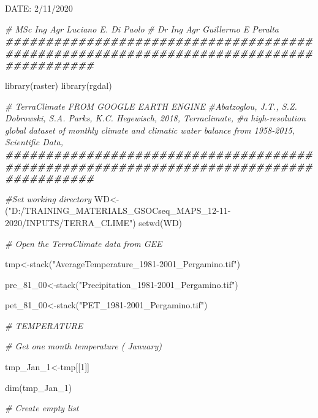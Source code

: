 \documentclass[
  10pt,
  b5paper,
]{book}
\newenvironment{Shaded}{\begin{snugshade}}{\end{snugshade}}
\newcommand{\CommentTok}[1]{\textcolor[rgb]{0.56,0.35,0.01}{\textit{#1}}}
\newcommand{\DecValTok}[1]{\textcolor[rgb]{0.00,0.00,0.81}{#1}}
\newcommand{\DocumentationTok}[1]{\textcolor[rgb]{0.56,0.35,0.01}{\textbf{\textit{#1}}}}
\newcommand{\FunctionTok}[1]{\textcolor[rgb]{0.00,0.00,0.00}{#1}}
\newcommand{\NormalTok}[1]{#1}
\newcommand{\OtherTok}[1]{\textcolor[rgb]{0.56,0.35,0.01}{#1}}
\newcommand{\SpecialCharTok}[1]{\textcolor[rgb]{0.00,0.00,0.00}{#1}}
\newcommand{\StringTok}[1]{\textcolor[rgb]{0.31,0.60,0.02}{#1}}
\begin{document}
\begin{Shaded}
\begin{Highlighting}[]
\NormalTok{DATE}\SpecialCharTok{:}  \DecValTok{2}\SpecialCharTok{/}\DecValTok{11}\SpecialCharTok{/}\DecValTok{2020}

\CommentTok{\#  MSc Ing Agr Luciano E. Di Paolo}
\CommentTok{\#  Dr Ing Agr Guillermo E Peralta}
\DocumentationTok{\#\#\#\#\#\#\#\#\#\#\#\#\#\#\#\#\#\#\#\#\#\#\#\#\#\#\#\#\#\#\#\#\#\#\#\#\#\#\#\#\#\#\#\#\#\#\#\#\#\#\#\#\#\#\#\#\#\#\#\#\#\#\#\#\#\#\#\#\#\#\#\#\#\#\#\#\#\#\#\#\#\#\#\#\#\#\#}

\FunctionTok{library}\NormalTok{(raster)}
\FunctionTok{library}\NormalTok{(rgdal)}


\CommentTok{\# TerraClimate FROM GOOGLE EARTH ENGINE}
\CommentTok{\#Abatzoglou, J.T., S.Z. Dobrowski, S.A. Parks, K.C. Hegewisch, 2018, Terraclimate, }
\CommentTok{\#a high{-}resolution global dataset of monthly climate and climatic water balance from 1958{-}2015, Scientific Data,}
\DocumentationTok{\#\#\#\#\#\#\#\#\#\#\#\#\#\#\#\#\#\#\#\#\#\#\#\#\#\#\#\#\#\#\#\#\#\#\#\#\#\#\#\#\#\#\#\#\#\#\#\#\#\#\#\#\#\#\#\#\#\#\#\#\#\#\#\#\#\#\#\#\#\#\#\#\#\#\#\#\#\#\#\#\#\#\#\#\#\#\#}

\CommentTok{\#Set working directory}
\NormalTok{WD}\OtherTok{\textless{}{-}}\NormalTok{(}\StringTok{"D:/TRAINING\_MATERIALS\_GSOCseq\_MAPS\_12{-}11{-}2020/INPUTS/TERRA\_CLIME"}\NormalTok{)}
\FunctionTok{setwd}\NormalTok{(WD)}


\CommentTok{\# Open the TerraClimate data from GEE}

\NormalTok{tmp}\OtherTok{\textless{}{-}}\FunctionTok{stack}\NormalTok{(}\StringTok{"AverageTemperature\_1981{-}2001\_Pergamino.tif"}\NormalTok{)}

\NormalTok{pre\_81\_00}\OtherTok{\textless{}{-}}\FunctionTok{stack}\NormalTok{(}\StringTok{"Precipitation\_1981{-}2001\_Pergamino.tif"}\NormalTok{)}

\NormalTok{pet\_81\_00}\OtherTok{\textless{}{-}}\FunctionTok{stack}\NormalTok{(}\StringTok{"PET\_1981{-}2001\_Pergamino.tif"}\NormalTok{)}


\CommentTok{\# TEMPERATURE}

\CommentTok{\# Get one month temperature ( January)}

\NormalTok{tmp\_Jan\_1}\OtherTok{\textless{}{-}}\NormalTok{tmp[[}\DecValTok{1}\NormalTok{]]}

\FunctionTok{dim}\NormalTok{(tmp\_Jan\_1)}

\CommentTok{\# Create empty list}


\end{Highlighting}
\end{Shaded}
\end{document}
